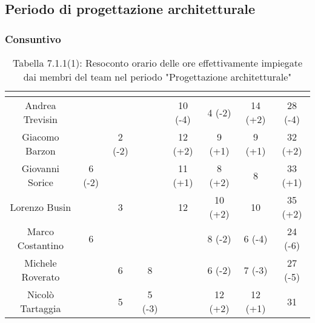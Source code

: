 \subsection{Periodo di progettazione architetturale}
\subsubsection{Consuntivo}
\renewcommand{\arraystretch}{1.5}
\begin{table}[H]
\begin{center}
\begin{tabular}{|c|c|c|c|c|c|c|c|}
\hline
\rowcolor{title_row}
\textbf{\color{title_text}{Nome}} & \textbf{\color{title_text}{Resp.}} & \textbf{\color{title_text}{Ammi.}} & \textbf{\color{title_text}{Analist.}} & \textbf{\color{title_text}{Progett.}} & \textbf{\color{title_text}{Program.}} & \textbf{\color{title_text}{Verific.}} & \textbf{\color{title_text}{Totale}} \\ \hline
Andrea Trevisin  & & & & 10 (-4) & 4 (-2) & 14 (+2) & 28 (-4) \\ \hline     %
Giacomo Barzon   & & 2 (-2) & & 12 (+2) & 9 (+1) & 9 (+1) & 32 (+2)  \\ \hline
Giovanni Sorice  & 6 (-2) & & & 11 (+1) & 8 (+2) & 8 & 33 (+1)  \\ \hline
Lorenzo Busin    & & 3 & & 12 & 10 (+2) & 10 & 35 (+2) \\ \hline
Marco Costantino & 6 & & & & 8 (-2) & 6 (-4) & 24 (-6) \\ \hline     %
Michele Roverato & & 6 & 8 & & 6 (-2) & 7 (-3) & 27 (-5) \\ \hline    %
Nicolò Tartaggia & & 5 & 5 (-3) & & 12 (+2) & 12 (+1) & 31  \\ \hline
\end{tabular}
\caption{Tabella 7.1.1(1): Resoconto orario delle ore effettivamente impiegate dai membri del team nel periodo "Progettazione architetturale"\label{}}
\end{center}
\end{table}
\renewcommand{\arraystretch}{1}

